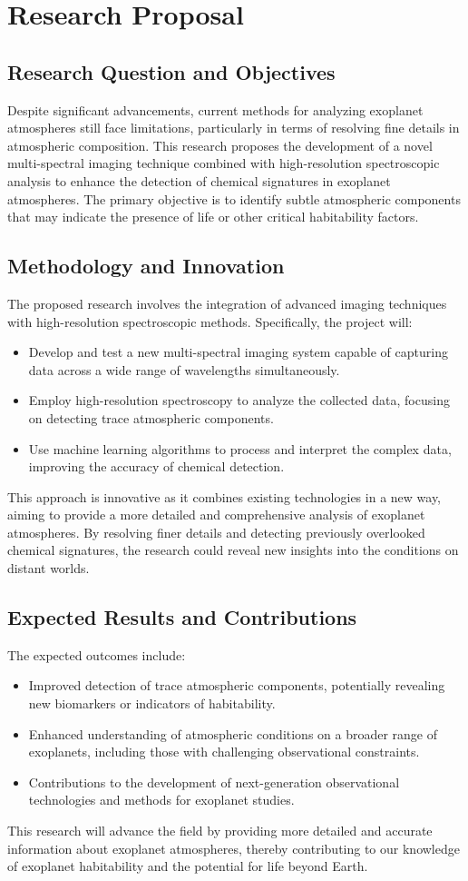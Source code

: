 \documentclass[12pt]{article}
\begin{document}
\section{Research Proposal}

\subsection{Research Question and Objectives}
Despite significant advancements, current methods for analyzing exoplanet atmospheres still face limitations, particularly in terms of resolving fine details in atmospheric composition. This research proposes the development of a novel multi-spectral imaging technique combined with high-resolution spectroscopic analysis to enhance the detection of chemical signatures in exoplanet atmospheres. The primary objective is to identify subtle atmospheric components that may indicate the presence of life or other critical habitability factors.

\subsection{Methodology and Innovation}
The proposed research involves the integration of advanced imaging techniques with high-resolution spectroscopic methods. Specifically, the project will:
\begin{itemize}
    \item Develop and test a new multi-spectral imaging system capable of capturing data across a wide range of wavelengths simultaneously.
    \item Employ high-resolution spectroscopy to analyze the collected data, focusing on detecting trace atmospheric components.
    \item Use machine learning algorithms to process and interpret the complex data, improving the accuracy of chemical detection.
\end{itemize}

This approach is innovative as it combines existing technologies in a new way, aiming to provide a more detailed and comprehensive analysis of exoplanet atmospheres. By resolving finer details and detecting previously overlooked chemical signatures, the research could reveal new insights into the conditions on distant worlds.

\subsection{Expected Results and Contributions}
The expected outcomes include:
\begin{itemize}
    \item Improved detection of trace atmospheric components, potentially revealing new biomarkers or indicators of habitability.
    \item Enhanced understanding of atmospheric conditions on a broader range of exoplanets, including those with challenging observational constraints.
    \item Contributions to the development of next-generation observational technologies and methods for exoplanet studies.
\end{itemize}

This research will advance the field by providing more detailed and accurate information about exoplanet atmospheres, thereby contributing to our knowledge of exoplanet habitability and the potential for life beyond Earth.
\end{document}
